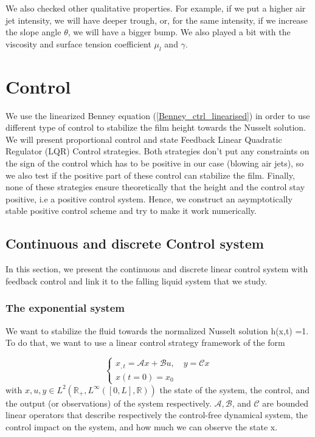 \documentclass[12pt]{article}
\begin{document}
We also checked other qualitative properties. For example, if we put a higher air jet intensity, we will have deeper trough, or, for the same intensity, if we increase the slope angle $\theta$, we will have a bigger bump. We also played a bit with the viscosity and surface tension coefficient $\mu_l$ and $\gamma$.





\newpage
\section{Control}\label{Section_Control}
We use the linearized Benney equation (\ref{Benney_ctrl_linearised}) in order to use different type of control to stabilize the film height towards the Nusselt solution. We will present proportional control and state Feedback Linear Quadratic Regulator (LQR) Control strategies. Both strategies don't put any constraints on the sign of the control which has to be positive in our case (blowing air jets), so we also test if the positive part of these control can stabilize the film. Finally, none of these strategies ensure theoretically that the height and the control stay positive, i.e a positive control system. Hence, we construct an asymptotically stable positive control scheme and try to make it work numerically.  



\subsection{Continuous and discrete Control system }
In this section, we present the continuous and discrete linear control system with feedback control and link it to the falling liquid system that we study.

\subsubsection{The exponential system}
We want to stabilize the fluid towards the normalized Nusselt solution h(x,t) =1. To do that, we want to use a linear control strategy framework of the form

\begin{equation}\label{Ctrl_framework_continuous}
    \left\{ 
    \begin{aligned}
        x_{,t} = \mathcal{A}x+\mathcal{B}u, \quad y=\mathcal{C}x\\
        x(t=0) = x_0
    \end{aligned}
    \right.
\end{equation}
with $x, u, y\in L^{2}(\mathbb{R}_+, L^{\infty}([0,L],\mathbb{R}))$ the state of the system, the control, and the output (or observations) of the system respectively. $\mathcal{A}, \mathcal{B}$, and $\mathcal{C}$ are bounded linear operators that describe respectively the control-free dynamical system, the control impact on the system, and how much we can observe the state x.
\\ 
\end{document}
